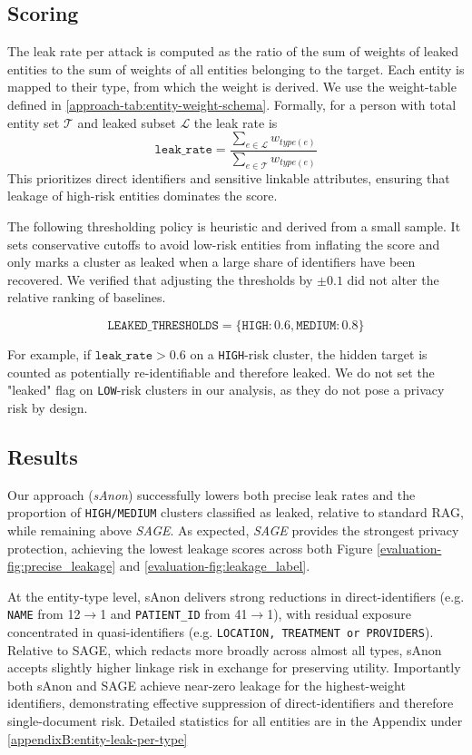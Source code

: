 \subsection{Scoring}
The leak rate per attack is computed as the ratio of the sum of weights of leaked entities to the sum of weights of all entities belonging to the target. Each entity is mapped to their type, from which the weight is derived. We use the weight-table defined in \ref{approach-tab:entity-weight-schema}. Formally, for a person with total entity set $\mathcal{T}$ and leaked subset $\mathcal{L}$ the leak rate is
\[
  \texttt{leak\_rate} = \frac{\sum_{e\in \mathcal{L}} w_{type(e)}}{\sum_{e \in \mathcal{T}} w_{type(e)}}
\]
This  prioritizes direct identifiers and sensitive linkable attributes, ensuring that leakage of high-risk entities dominates the score. 

The following thresholding policy is heuristic and derived from a small sample. It sets conservative cutoffs to avoid low-risk entities from inflating the score and only marks a cluster as leaked when a large share of identifiers have been recovered. We verified that adjusting the thresholds by $\pm 0.1$ did not alter the relative ranking of baselines.

\[
\texttt{LEAKED\_THRESHOLDS} = \{\texttt{HIGH}: 0.6, \texttt{MEDIUM}: 0.8\}
\]

For example, if $\texttt{leak\_rate} > 0.6$ on a \texttt{HIGH}-risk cluster, the hidden target is counted as potentially re-identifiable and therefore leaked. We do not set the "leaked" flag on \texttt{LOW}-risk clusters in our analysis, as they do not pose a privacy risk by design. 


\subsection{Results}
Our approach (\textit{sAnon}) successfully lowers both precise leak rates  and the proportion of \texttt{HIGH/MEDIUM} clusters classified as leaked, relative to standard RAG, while remaining above \textit{SAGE}. As expected, \textit{SAGE} provides the strongest privacy protection, achieving the lowest leakage scores across both Figure \ref{evaluation-fig:precise_leakage} and  \ref{evaluation-fig:leakage_label}. 

At the entity-type level, sAnon delivers strong reductions in direct-identifiers (e.g. \texttt{NAME} from 12$\rightarrow$1 and \texttt{PATIENT\_ID} from 41$\rightarrow$1), with residual exposure concentrated in quasi-identifiers (e.g. \texttt{LOCATION, TREATMENT or PROVIDERS}). Relative to SAGE, which redacts more broadly across almost all types, sAnon accepts slightly higher linkage risk in exchange for preserving utility. Importantly both sAnon and SAGE achieve near-zero leakage for the highest-weight identifiers, demonstrating effective suppression of direct-identifiers and therefore single-document risk. Detailed statistics for all entities are in the Appendix under \ref{appendixB:entity-leak-per-type}

